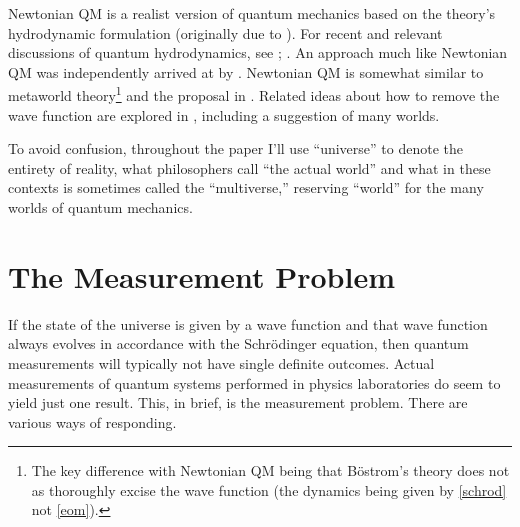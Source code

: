 \documentclass[12pt,secnumarabic,balancelastpage,amsmath,amssymb,nofootinbib]{article}
\begin{document}

Newtonian QM is a realist version of quantum mechanics based on the theory's hydrodynamic formulation (originally due to \citealp{madelung1927}).  For recent and relevant discussions of quantum hydrodynamics, see \citet{wyatt2005}; \citet{holland2005}.  An approach much like Newtonian QM was independently arrived at by \cite{HDW}.  Newtonian QM is somewhat similar to  \citeyearpar{bostrom2012} metaworld theory\footnote{The key difference with Newtonian QM being that B\"{o}strom's theory does not as thoroughly excise the wave function (the dynamics being given by \eqref{schrod} not \eqref{eom}).} and the proposal in \citet{tipler}.  Related ideas about how to remove the wave function are explored in \citet{poirier2010, schiff2012}, including a suggestion of many worlds.

To avoid confusion, throughout the paper I'll use ``universe'' to denote the entirety of reality, what philosophers call ``the actual world'' and what in these contexts is sometimes called the ``multiverse,'' reserving ``world'' for the many worlds of quantum mechanics.

\section{The Measurement Problem}\label{measprob}

If the state of the universe is given by a wave function and that wave function always evolves in accordance with the Schr\"{o}dinger equation, then quantum measurements will typically not have single definite outcomes.  Actual measurements of quantum systems performed in physics laboratories do seem to yield just one result.  This, in brief, is the measurement problem.  There are various ways of responding.
\end{document}
